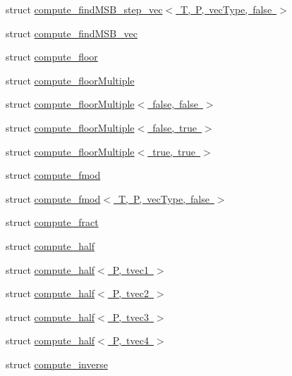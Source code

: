 \begin{DoxyCompactItemize}
\item 
struct \mbox{\hyperlink{structglm_1_1detail_1_1compute__find_m_s_b__step__vec_3_01_t_00_01_p_00_01vec_type_00_01false_01_4}{compute\+\_\+find\+M\+S\+B\+\_\+step\+\_\+vec$<$ T, P, vec\+Type, false $>$}}
\item 
struct \mbox{\hyperlink{structglm_1_1detail_1_1compute__find_m_s_b__vec}{compute\+\_\+find\+M\+S\+B\+\_\+vec}}
\item 
struct \mbox{\hyperlink{structglm_1_1detail_1_1compute__floor}{compute\+\_\+floor}}
\item 
struct \mbox{\hyperlink{structglm_1_1detail_1_1compute__floor_multiple}{compute\+\_\+floor\+Multiple}}
\item 
struct \mbox{\hyperlink{structglm_1_1detail_1_1compute__floor_multiple_3_01false_00_01false_01_4}{compute\+\_\+floor\+Multiple$<$ false, false $>$}}
\item 
struct \mbox{\hyperlink{structglm_1_1detail_1_1compute__floor_multiple_3_01false_00_01true_01_4}{compute\+\_\+floor\+Multiple$<$ false, true $>$}}
\item 
struct \mbox{\hyperlink{structglm_1_1detail_1_1compute__floor_multiple_3_01true_00_01true_01_4}{compute\+\_\+floor\+Multiple$<$ true, true $>$}}
\item 
struct \mbox{\hyperlink{structglm_1_1detail_1_1compute__fmod}{compute\+\_\+fmod}}
\item 
struct \mbox{\hyperlink{structglm_1_1detail_1_1compute__fmod_3_01_t_00_01_p_00_01vec_type_00_01false_01_4}{compute\+\_\+fmod$<$ T, P, vec\+Type, false $>$}}
\item 
struct \mbox{\hyperlink{structglm_1_1detail_1_1compute__fract}{compute\+\_\+fract}}
\item 
struct \mbox{\hyperlink{structglm_1_1detail_1_1compute__half}{compute\+\_\+half}}
\item 
struct \mbox{\hyperlink{structglm_1_1detail_1_1compute__half_3_01_p_00_01tvec1_01_4}{compute\+\_\+half$<$ P, tvec1 $>$}}
\item 
struct \mbox{\hyperlink{structglm_1_1detail_1_1compute__half_3_01_p_00_01tvec2_01_4}{compute\+\_\+half$<$ P, tvec2 $>$}}
\item 
struct \mbox{\hyperlink{structglm_1_1detail_1_1compute__half_3_01_p_00_01tvec3_01_4}{compute\+\_\+half$<$ P, tvec3 $>$}}
\item 
struct \mbox{\hyperlink{structglm_1_1detail_1_1compute__half_3_01_p_00_01tvec4_01_4}{compute\+\_\+half$<$ P, tvec4 $>$}}
\item 
struct \mbox{\hyperlink{structglm_1_1detail_1_1compute__inverse}{compute\+\_\+inverse}}

\end{DoxyCompactItemize}
